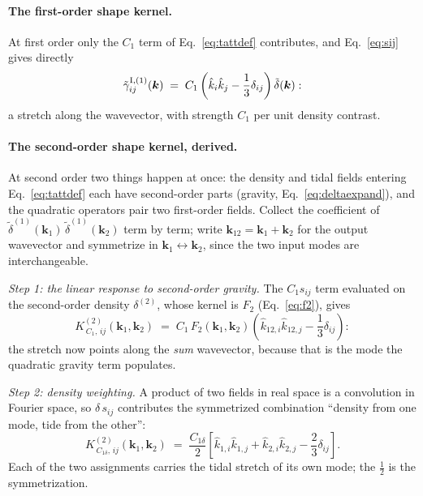 \documentclass[11pt]{article}
\newcommand{\bk}{\boldsymbol{k}}
\numberwithin{equation}{section}
\begin{document}
\paragraph{The first-order shape kernel.}
At first order only the $C_1$ term of Eq.~\eqref{eq:tattdef}
contributes, and Eq.~\eqref{eq:sij} gives directly
\begin{equation}
  \tilde\gamma^{{\rm I},(1)}_{ij}(\bk)
  \;=\;
  C_1
  \left(\hat k_i \hat k_j - \frac{1}{3}\delta_{ij}\right)
  \tilde\delta(\bk) :
  \label{eq:k1shape}
\end{equation}
a stretch along the wavevector, with strength $C_1$ per unit density
contrast.

\paragraph{The second-order shape kernel, derived.}
At second order two things happen at once: the density and tidal
fields entering Eq.~\eqref{eq:tattdef} each have second-order parts
(gravity, Eq.~\eqref{eq:deltaexpand}), and the quadratic operators
pair two first-order fields.  Collect the coefficient of
$\tilde\delta^{(1)}(\bk_1)\,\tilde\delta^{(1)}(\bk_2)$ term by
term; write $\bk_{12} = \bk_1 + \bk_2$ for the output wavevector and
symmetrize in $\bk_1 \leftrightarrow \bk_2$, since the two input
modes are interchangeable.

\emph{Step 1: the linear response to second-order gravity.}  The
$C_1 s_{ij}$ term evaluated on the second-order density
$\delta^{(2)}$, whose kernel is $F_2$ (Eq.~\eqref{eq:f2}), gives
\begin{equation}
  K^{(2)}_{\,C_1,\,ij}(\bk_1,\bk_2)
  \;=\;
  C_1\, F_2(\bk_1,\bk_2)
  \left(\hat k_{12,i}\hat k_{12,j}
  - \frac{1}{3}\delta_{ij}\right) :
  \label{eq:k2lin}
\end{equation}
the stretch now points along the \emph{sum} wavevector, because that
is the mode the quadratic gravity term populates.

\emph{Step 2: density weighting.}  A product of two fields in real
space is a convolution in Fourier space, so $\delta\, s_{ij}$
contributes the symmetrized combination ``density from one mode,
tide from the other'':
\begin{equation}
  K^{(2)}_{\,C_{1\delta},\,ij}(\bk_1,\bk_2)
  \;=\;
  \frac{C_{1\delta}}{2}
  \left[
  \hat k_{1,i}\hat k_{1,j} + \hat k_{2,i}\hat k_{2,j}
  - \frac{2}{3}\delta_{ij}
  \right] .
  \label{eq:k2den}
\end{equation}
Each of the two assignments carries the tidal stretch of its own
mode; the $\tfrac12$ is the symmetrization.
\end{document}

